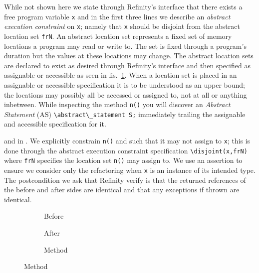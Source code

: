 While not shown here we state through Refinity's interface that there exists a free program variable \lstinline[style=refinity]|x| and in the first three lines we describe
an \emph{abstract execution constraint} on \lstinline[style=refinity]|x|; namely that \lstinline[style=refinity]|x| should be disjoint from the abstract location set \lstinline[style=refinity]|frN|.
An abstract location set represents a fixed set of memory locations a program may read or write to. The set is fixed through a program's duration but the values at these locations may change.
The abstract location sets are declared to exist as desired through Refinity's interface and then specified as assignable or accessible as seen in lis.~\ref{lst:ExtractVariable-refinity}.
When a location set is placed in an assignable or accessible specification it is to be understood as an upper bound; the locations may possibly all be accessed or assigned to, not at all or
anything inbetween. While inspecting the method \lstinline[style=refinity]|n()| you will discover an \emph{Abstract Statement} (AS) \lstinline[style=refinity]|\abstract\_statement S;|
immediately trailing the assignable and accessible specification for it.

and in . We explicitly constrain \lstinline[style=refinity]|n()| and such that it may not assign to \lstinline[style=refinity]|x|; this is done through the abstract execution constraint specification \lstinline[style=refinity]|\disjoint(x,frN)|
where \lstinline[style=refinity]|frN| specifies the location set \lstinline[style=refinity]|n()| may assign to. We use an assertion to ensure we consider only the refactoring
when \lstinline[style=refinity]|x| is an instance of its intended type. The postcondition we ask that Refinity verify is that the returned references of the before and after
sides are identical and that any exceptions if thrown are identical.
\begin{figure}[!h]
  \centering
  \begin{subfigure}[b]{.34\linewidth}
    
    \caption{Before}
  \end{subfigure}\hspace{1cm}
  \begin{subfigure}[b]{.34\linewidth}
    
    \caption{After}
  \end{subfigure}\vspace{1mm}
  \begin{subfigure}[b]{.39\linewidth}
    
    \caption{Method}
  \end{subfigure}
\label{lst:ExtractVariable-refinity}
\end{figure}




